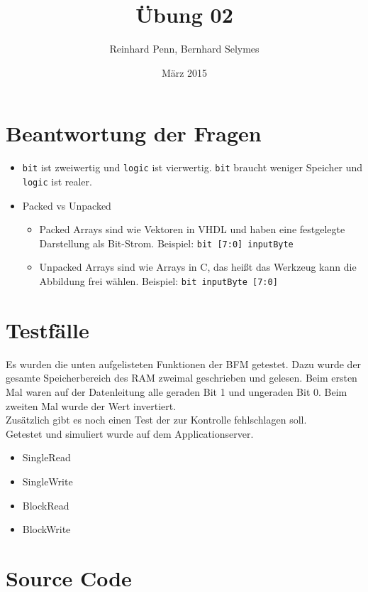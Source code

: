 \documentclass[12pt,a4paper]{article}
\begin{document}
\title{Übung 02}
\author{Reinhard Penn, Bernhard Selymes}
\date{März 2015}

\normalsize


\newcommand{\Uebung}{BFMSV}
\newcommand{\srcpath}{../../src}
\newcommand{\simpath}{../../sim}



\section{Beantwortung der Fragen}

\begin{itemize}
	\item \texttt{bit} ist zweiwertig und \texttt{logic} ist vierwertig. \texttt{bit} braucht weniger Speicher und \texttt{logic} ist realer.
	\item Packed vs Unpacked
		\begin{itemize}
			\item Packed Arrays sind wie Vektoren in VHDL und haben eine festgelegte Darstellung als Bit-Strom. Beispiel: \texttt{bit [7:0] inputByte}
			\item Unpacked Arrays sind wie Arrays in C, das heißt das Werkzeug kann die Abbildung frei wählen. Beispiel: \texttt{bit inputByte [7:0]}
		\end{itemize}
\end{itemize}


\section{Testfälle}
Es wurden die unten aufgelisteten Funktionen der BFM getestet. Dazu wurde der gesamte Speicherbereich des RAM zweimal geschrieben und gelesen. Beim ersten Mal waren auf der Datenleitung alle geraden Bit 1 und ungeraden Bit 0. Beim zweiten Mal wurde der Wert invertiert. 
\\
Zusätzlich gibt es noch einen Test der zur Kontrolle fehlschlagen soll.
\\
Getestet und simuliert wurde auf dem Applicationserver.

\begin{itemize}
	\item SingleRead
	\item SingleWrite
	\item BlockRead
	\item BlockWrite
\end{itemize}

\section{Source Code}





\end{document}
